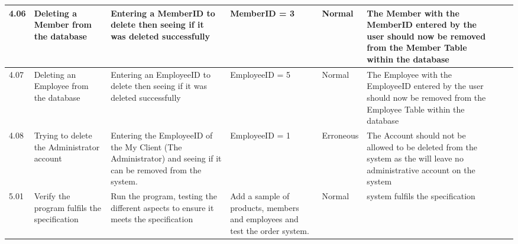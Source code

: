 \begin{landscape}
\begin{flushleft}
\begin{longtable}{|p{1.5cm}|p{2.5cm}|p{2.5cm}|p{2cm}|p{2cm}|p{2cm}|p{2cm}|p{2cm}|}
	4.06 & Deleting a Member from the database &  Entering a MemberID to delete then seeing if it was deleted successfully & MemberID = 3 & Normal & The Member with the MemberID entered by the user should now be removed from the Member Table within the database && \\ \hline
	4.07 & Deleting an Employee from the database &  Entering an EmployeeID to delete then seeing if it was deleted successfully & EmployeeID = 5 & Normal & The Employee with the EmployeeID entered by the user should now be removed from the Employee Table within the database && \\ \hline
	4.08 & Trying to delete the Administrator account  & Entering the EmployeeID of the My Client (The Administrator) and seeing if it can be removed from the system. & EmployeeID = 1 & Erroneous & The Account should not be allowed to be deleted from the system as the will leave no administrative account on the system && \\ \hline
	5.01 & Verify the program fulfils the specification & Run the program, testing the different aspects to ensure it meets the specification & Add a sample of products, members and employees and test the order system.  & Normal &system fulfils the specification & & \\ \hline

	

    \end{longtable}
\end{flushleft}
\end{landscape}